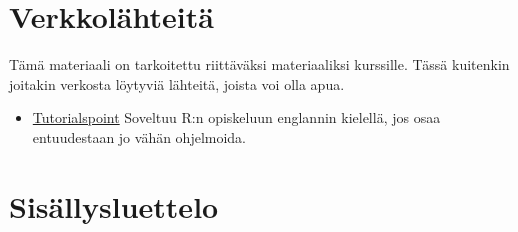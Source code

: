 \documentclass[
]{book}
\providecommand{\tightlist}{%
  \setlength{\itemsep}{0pt}\setlength{\parskip}{0pt}}
\begin{document}
\hypertarget{verkkoluxe4hteituxe4}{%
\section*{Verkkolähteitä}\label{verkkoluxe4hteituxe4}}

Tämä materiaali on tarkoitettu riittäväksi materiaaliksi kurssille. Tässä kuitenkin joitakin verkosta löytyviä lähteitä, joista voi olla apua.

\begin{itemize}
\tightlist
\item
  \href{https://www.tutorialspoint.com/r/index.htm}{Tutorialspoint} Soveltuu R:n opiskeluun englannin kielellä, jos osaa entuudestaan jo vähän ohjelmoida.
\end{itemize}

\hypertarget{sisuxe4llysluettelo}{%
\section*{Sisällysluettelo}\label{sisuxe4llysluettelo}}
\end{document}
